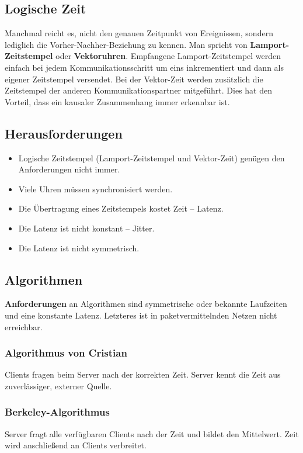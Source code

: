 \documentclass{article} %
\begin{document}
\subsection{Logische Zeit}
Manchmal reicht es, nicht den genauen Zeitpunkt von Ereignissen, sondern lediglich die Vorher-Nachher-Beziehung zu kennen.
Man spricht von \textbf{Lamport-Zeitstempel} oder \textbf{Vektoruhren}.
Empfangene Lamport-Zeitstempel werden einfach bei jedem Kommunikationsschritt um eins inkrementiert und dann als eigener Zeitstempel versendet.
Bei der Vektor-Zeit werden zusätzlich die Zeitstempel der anderen Kommunikationspartner mitgeführt.
Dies hat den Vorteil, dass ein kausaler Zusammenhang immer erkennbar ist.

\subsection{Herausforderungen}
\begin{itemize}
	\item Logische Zeitstempel (Lamport-Zeitstempel und Vektor-Zeit) genügen den Anforderungen nicht immer.
	\item Viele Uhren müssen synchronisiert werden.
	\item Die Übertragung eines Zeitstempels kostet Zeit – Latenz.
	\item Die Latenz ist nicht konstant – Jitter.
	\item Die Latenz ist nicht symmetrisch.
\end{itemize}

\subsection{Algorithmen}
\textbf{Anforderungen} an Algorithmen sind symmetrische oder bekannte Laufzeiten und eine konstante Latenz.
Letzteres ist in paketvermittelnden Netzen nicht erreichbar.
\subsubsection{Algorithmus von Cristian}
Clients fragen beim Server nach der korrekten Zeit.
Server kennt die Zeit aus zuverlässiger, externer Quelle.

\subsubsection{Berkeley-Algorithmus}
Server fragt alle verfügbaren Clients nach der Zeit und bildet den Mittelwert.
Zeit wird anschließend an Clients verbreitet.
\end{document}
